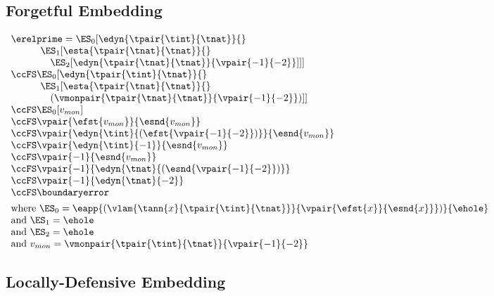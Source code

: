 \subsection{Forgetful Embedding}

$\begin{array}{l}
  \erelprime = \ES_0[\edyn{\tpair{\tint}{\tnat}}{}
\\\qquad\quad \ES_1[\esta{\tpair{\tnat}{\tnat}}{}
\\\qquad\quad\quad \ES_2[\edyn{\tpair{\tnat}{\tnat}}{\vpair{-1}{-2}}]]]
\\\ccFS \ES_0[\edyn{\tpair{\tint}{\tnat}}{}
\\\qquad\quad \ES_1[\esta{\tpair{\tnat}{\tnat}}{}
\\\qquad\quad\quad (\vmonpair{\tpair{\tnat}{\tnat}}{\vpair{-1}{-2}})]]
\\\ccFS \ES_0[v_{mon}]
\\\ccFS \vpair{\efst{v_{mon}}}{\esnd{v_{mon}}}
\\\ccFS \vpair{\edyn{\tint}{(\efst{\vpair{-1}{-2}})}}{\esnd{v_{mon}}}
\\\ccFS \vpair{\edyn{\tint}{{-1}}}{\esnd{v_{mon}}}
\\\ccFS \vpair{{-1}}{\esnd{v_{mon}}}
\\\ccFS \vpair{{-1}}{\edyn{\tnat}{(\esnd{\vpair{-1}{-2}})}}
\\\ccFS \vpair{{-1}}{\edyn{\tnat}{-2}}
\\\ccFS \boundaryerror
\\[1ex]
  \mbox{where } \ES_0 = \eapp{(\vlam{\tann{x}{\tpair{\tint}{\tnat}}}{\vpair{\efst{x}}{\esnd{x}}})}{\ehole}
\\\mbox{and } \ES_1 = \ehole
\\\mbox{and } \ES_2 = \ehole
\\\mbox{and } v_{mon} = \vmonpair{\tpair{\tint}{\tnat}}{\vpair{-1}{-2}}
\end{array}$

\subsection{Locally-Defensive Embedding}

